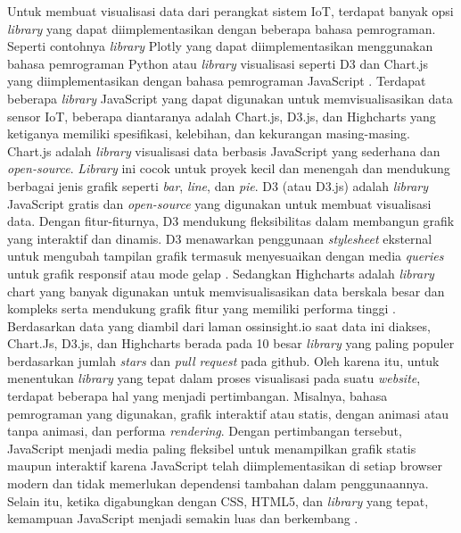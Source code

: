 Untuk membuat visualisasi data dari perangkat sistem IoT, terdapat banyak opsi \textit{library} yang dapat diimplementasikan dengan beberapa bahasa pemrograman. Seperti contohnya \textit{library} Plotly yang dapat diimplementasikan menggunakan bahasa pemrograman Python \cite{Bostrm2022} atau \textit{library} visualisasi seperti D3 dan Chart.js yang diimplementasikan dengan bahasa pemrograman JavaScript \cite{Persson2021}. Terdapat beberapa \textit{library} JavaScript yang dapat digunakan untuk memvisualisasikan data sensor IoT, beberapa diantaranya adalah Chart.js, D3.js, dan Highcharts yang ketiganya memiliki spesifikasi, kelebihan, dan kekurangan masing-masing. Chart.js adalah \textit{library} visualisasi data berbasis JavaScript yang sederhana dan \textit{open-source}. \textit{Library} ini cocok untuk proyek kecil dan menengah dan mendukung berbagai jenis grafik seperti \textit{bar}, \textit{line}, dan \textit{pie}\cite{ChartJs}. D3 (atau D3.js) adalah \textit{library} JavaScript gratis dan \textit{open-source} yang digunakan untuk membuat visualisasi data. Dengan fitur-fiturnya, D3 mendukung fleksibilitas dalam membangun grafik yang interaktif dan dinamis. D3 menawarkan penggunaan \textit{stylesheet} eksternal untuk mengubah tampilan grafik termasuk menyesuaikan dengan media \textit{queries} untuk grafik responsif atau mode gelap \cite{D3}. Sedangkan Highcharts adalah \textit{library} chart yang banyak digunakan untuk memvisualisasikan data berskala besar dan kompleks serta mendukung grafik fitur yang memiliki performa tinggi \cite{D3}. Berdasarkan data yang diambil dari laman ossinsight.io saat data ini diakses, Chart.Js, D3.js, dan Highcharts berada pada 10 besar \textit{library} yang paling populer berdasarkan jumlah \textit{stars} dan \textit{pull request} pada github\cite{ossinsight}.
Oleh karena itu, untuk menentukan \textit{library} yang tepat dalam proses visualisasi pada suatu \textit{website}, terdapat beberapa hal yang menjadi pertimbangan. Misalnya, bahasa pemrograman yang digunakan, grafik interaktif atau statis, dengan animasi atau tanpa animasi, dan performa \textit{rendering}. Dengan pertimbangan tersebut, JavaScript menjadi media paling fleksibel untuk menampilkan grafik statis maupun interaktif karena JavaScript telah diimplementasikan di setiap browser modern dan tidak memerlukan dependensi tambahan dalam penggunaannya. Selain itu, ketika digabungkan dengan CSS, HTML5, dan \textit{library} yang tepat, kemampuan JavaScript menjadi semakin luas dan berkembang \cite{Persson2021} \cite{Renear2010}.

